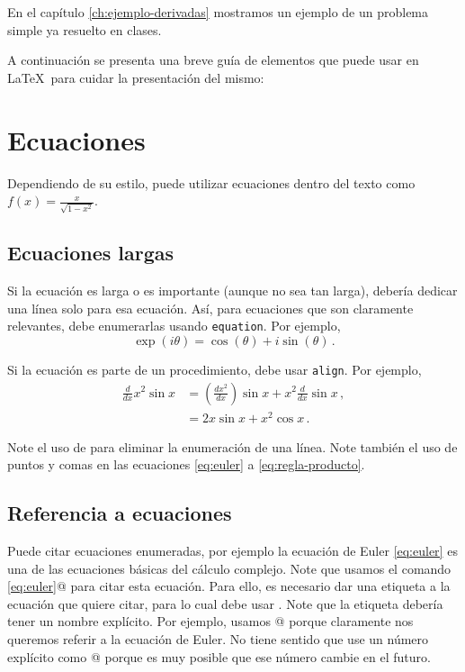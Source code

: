 \documentclass[../portafolio.tex]{subfiles}
\begin{document}
En el capítulo \ref{ch:ejemplo-derivadas} mostramos un ejemplo de un problema simple ya resuelto en clases.


A continuación se presenta una breve guía de elementos que puede usar en \LaTeX\ para cuidar la presentación del mismo:
\section{Ecuaciones}

Dependiendo de su estilo, puede utilizar ecuaciones dentro del texto como
$f(x)=\frac{x}{\sqrt{1-x^2}}$.

\subsection{Ecuaciones largas}
Si la ecuación es larga o es importante (aunque no sea tan larga), debería dedicar una línea solo para esa ecuación. Así, para ecuaciones que son claramente relevantes, debe enumerarlas usando \texttt{equation}. Por ejemplo,
\begin{equation}
  \label{eq:euler}
\exp(i\theta) = \cos(\theta) + i\sin(\theta) \,.
\end{equation}

Si la ecuación es parte de un procedimiento, debe usar \texttt{align}. Por ejemplo,
\begin{align}
  \frac{d}{dx} x^2 \sin x
  &= \left(\frac{dx^2}{dx}\right)  \sin x + x^2 \frac{d}{dx} \sin x \,, \nonumber \\
  &= 2x \sin x + x^2 \cos x \,. \label{eq:regla-producto}
\end{align}

Note el uso de \verb@\nonumber@ para eliminar la enumeración de una
línea. Note también el uso de puntos y comas en las ecuaciones
\eqref{eq:euler} a \eqref{eq:regla-producto}.

\subsection{Referencia a ecuaciones}
Puede citar ecuaciones enumeradas, por ejemplo la ecuación de Euler
\eqref{eq:euler} es una de las ecuaciones básicas del cálculo
complejo. Note que usamos el comando \verb@\eqref{eq:euler}@ para citar esta
ecuación. Para ello, es necesario dar una etiqueta a la ecuación que
quiere citar, para lo cual debe usar \verb@{}. Note que la
etiqueta debería tener un nombre explícito. Por ejemplo, usamos
\verb@\label{eq:euler}@ porque claramente nos queremos referir a la
ecuación de Euler. No tiene sentido que use un número explícito como
\verb@\label{eq:1}@ porque es muy posible que ese número cambie en el
futuro.
\end{document}
